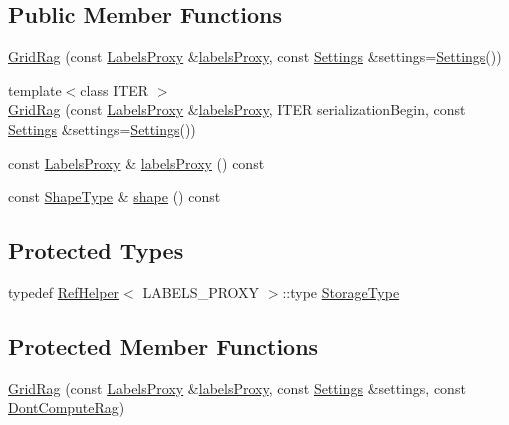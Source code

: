 \subsection*{Public Member Functions}
\begin{DoxyCompactItemize}
\item 
\hyperlink{classnifty_1_1graph_1_1GridRag_ae00a91d33acff711f967d2d57bde8cec}{Grid\+Rag} (const \hyperlink{classnifty_1_1graph_1_1GridRag_ad3146f72301da4f45b51e3b692776cf1}{Labels\+Proxy} \&\hyperlink{classnifty_1_1graph_1_1GridRag_a9a9b20451bd5ea8ce3ee11af4018c995}{labels\+Proxy}, const \hyperlink{structnifty_1_1graph_1_1GridRag_1_1Settings}{Settings} \&settings=\hyperlink{structnifty_1_1graph_1_1GridRag_1_1Settings}{Settings}())
\item 
{\footnotesize template$<$class I\+T\+E\+R $>$ }\\\hyperlink{classnifty_1_1graph_1_1GridRag_a819677978ae2457110b5f22ef3ba0781}{Grid\+Rag} (const \hyperlink{classnifty_1_1graph_1_1GridRag_ad3146f72301da4f45b51e3b692776cf1}{Labels\+Proxy} \&\hyperlink{classnifty_1_1graph_1_1GridRag_a9a9b20451bd5ea8ce3ee11af4018c995}{labels\+Proxy}, I\+T\+E\+R serialization\+Begin, const \hyperlink{structnifty_1_1graph_1_1GridRag_1_1Settings}{Settings} \&settings=\hyperlink{structnifty_1_1graph_1_1GridRag_1_1Settings}{Settings}())
\item 
const \hyperlink{classnifty_1_1graph_1_1GridRag_ad3146f72301da4f45b51e3b692776cf1}{Labels\+Proxy} \& \hyperlink{classnifty_1_1graph_1_1GridRag_a9a9b20451bd5ea8ce3ee11af4018c995}{labels\+Proxy} () const 
\item 
const \hyperlink{classnifty_1_1graph_1_1GridRag_a3693e007e1419dec9751cca751a1061d}{Shape\+Type} \& \hyperlink{classnifty_1_1graph_1_1GridRag_adfc9dfed7d49642925311229e47a5cd2}{shape} () const 
\end{DoxyCompactItemize}
\subsection*{Protected Types}
\begin{DoxyCompactItemize}
\item 
typedef \hyperlink{structnifty_1_1graph_1_1RefHelper}{Ref\+Helper}$<$ L\+A\+B\+E\+L\+S\+\_\+\+P\+R\+O\+X\+Y $>$\+::type \hyperlink{classnifty_1_1graph_1_1GridRag_ae7dcf657b20ef49d062648978e192cdb}{Storage\+Type}
\end{DoxyCompactItemize}
\subsection*{Protected Member Functions}
\begin{DoxyCompactItemize}
\item 
\hyperlink{classnifty_1_1graph_1_1GridRag_a3345ae3446c64f5758305ae69db71f72}{Grid\+Rag} (const \hyperlink{classnifty_1_1graph_1_1GridRag_ad3146f72301da4f45b51e3b692776cf1}{Labels\+Proxy} \&\hyperlink{classnifty_1_1graph_1_1GridRag_a9a9b20451bd5ea8ce3ee11af4018c995}{labels\+Proxy}, const \hyperlink{structnifty_1_1graph_1_1GridRag_1_1Settings}{Settings} \&settings, const \hyperlink{structnifty_1_1graph_1_1GridRag_1_1DontComputeRag}{Dont\+Compute\+Rag})
\end{DoxyCompactItemize}
